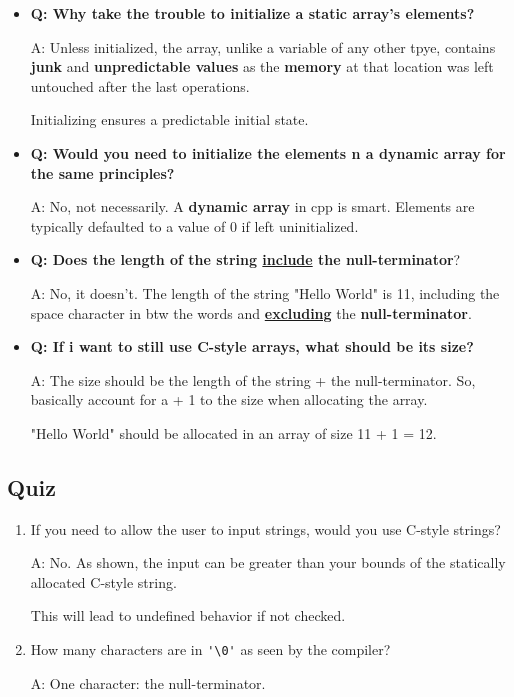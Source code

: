 \documentclass[10pt]{article}
\begin{document}
\begin{itemize}
	\item \textbf{Q: Why take the trouble to initialize a static array's elements?}

		A: Unless initialized, the array, unlike a variable of any other tpye, contains \textbf{junk} and \textbf{unpredictable values} as the \textbf{memory} at that location was left untouched after the last operations.

		Initializing ensures a predictable initial state.\\

	\item \textbf{Q: Would you need to initialize the elements n a dynamic array for the same principles?}

	A: No, not necessarily. A \textbf{dynamic array} in cpp is smart. Elements are typically defaulted to a value of 0 if left uninitialized.\\

\item \textbf{Q: Does the length of the string \underline{include} the null-terminator}?

	A: No, it doesn't. The length of the string "Hello World" is 11, including the space character in btw the words and \underline{\textbf{excluding}} the \textbf{null-terminator}.\\

\item \textbf{Q: If i want to still use C-style arrays, what should be its size?}

	A: The size should be the length of the string + the null-terminator. So, basically account for a + 1 to the size when allocating the array.

	"Hello World" should be allocated in an array of size 11 + 1 = 12.
\end{itemize}

\newpage

\subsection{Quiz}
\begin{enumerate}
	\item If you need to allow the user to input strings, would you use C-style strings?

	A: No. As shown, the input can be greater than your bounds of the statically allocated C-style string.

	This will lead to undefined behavior if not checked.\\

\item How many characters are in \verb|'\0'| as seen by the compiler?

	A: One character: the null-terminator.
\end{enumerate}
\end{document}
